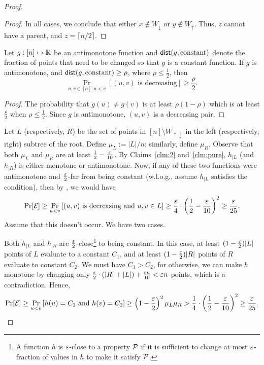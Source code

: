 \begin{proof}
\begin{proof}
    In all cases, we conclude that either $x\notin W_{\downarrow}$ or
    $y\notin W_{\uparrow}$.
    Thus, $z$ cannot have a parent, and $z = \lceil n/2 \rceil$.
\end{proof}

\begin{claim}\label{clm:obv}
Let $g:[n] \mapsto {\mathbb R}$ be an antimonotone function and $\mathsf{dist}(g, \mathrm{constant})$ denote the fraction of points that need to be changed so that $g$ is a constant function.
	If $g$ is antimonotone, and $\mathsf{dist}(g, \mathrm{constant}) \geq \rho$, where $\rho \le \frac 1 2$, then
	$$\Pr\limits_{u,v \in [n]: u < v} [(u,v) \textrm{ is decreasing}] \geq \frac\rho 2 .$$
\end{claim}

\begin{proof}
	The probability that $g(u) \neq g(v)$ is at least $\rho(1-\rho)$ which is at least $\frac \rho 2$ when $\rho \le \frac 1 2$. Since $g$ is antimonotone, $(u,v)$ is a decreasing pair.
\end{proof}

\noindent
Let $L$ (respectively, $R$) be the set of points in $[n] \setminus W_{\uparrow \downarrow}$ in the left (respectively, right) subtree of the root. Define $\mu_L := |L|/n$; similarly, define $\mu_R$.
Observe that both $\mu_L$ and $\mu_R$ are at least $\frac{1}{2} - \frac{\varepsilon}{10}$.
By Claims~\ref{clm:2} and~\ref{clm:pure}, $h_{|L}$ (and $h_{|R}$) is either monotone or antimonotone.
Now, if any of these two functions were antimonotone and $\frac{\varepsilon} 2$-far from being constant (w.l.o.g., assume $h_{|L}$ satisfies the condition), then by , we would have
\[
\Pr[{\cal E}] \geq \Pr\limits_{u < v}\left[(u,v) \textrm{ is decreasing and }  u,v \in L \right] \geq  \frac{\varepsilon} 4 \cdot \left(\frac{1}{2} - \frac{\varepsilon}{10} \right)^2  \geq \frac{\varepsilon}{25}.
\]
Assume that this doesn't occur. We have two cases.

 Both $h_{|L}$ and $h_{|R}$ are $\frac{\varepsilon} 2$-close\footnote{A function $h$ is $\varepsilon$-close to a property $\mathcal{P}$ if it is sufficient to change at most $\varepsilon$-fraction of values in $h$ to make it satisfy $\mathcal{P}$.}
to being constant. In this case, at least $(1-\frac{\varepsilon} 2)|L|$ points of $L$ evaluate to a constant $C_1$, and at least $(1-\frac{\varepsilon} 2)|R|$ points of $R$ evaluate to constant $C_2$. We must have $C_1 > C_2$, for otherwise, we can make $h$ monotone by changing only $\frac{\varepsilon} 2 \cdot (|R|+|L|)+\frac{\varepsilon n}{10} < \varepsilon n$ points, which is a contradiction.
Hence,
\[
\Pr[{\cal E}] \geq \Pr\limits_{u < v} \left[h(u) = C_1 \textrm{ and } h(v) = C_2 \right] \geq \left(1-\frac{\varepsilon} 2 \right)^2 \mu_L\mu_R > \frac{1}{4} \cdot \left(\frac 1 2- \frac{\varepsilon}{10} \right)^2 \geq \frac{\varepsilon}{25}.
\]


\end{proof}
